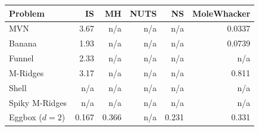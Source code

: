 \begin{tabular}{lrrrrr}
\toprule
Problem & IS & MH & NUTS & NS & MoleWhacker \\
\midrule
MVN & 3.67 & n/a & n/a & n/a & 0.0337 \\
Banana & 1.93 & n/a & n/a & n/a & 0.0739 \\
Funnel & 2.33 & n/a & n/a & n/a & n/a \\
M-Ridges & 3.17 & n/a & n/a & n/a & 0.811 \\
Shell & n/a & n/a & n/a & n/a & n/a \\
Spiky M-Ridges & n/a & n/a & n/a & n/a & n/a \\
\midrule
Eggbox ($d=2$) & 0.167 & 0.366 & n/a & 0.231 & 0.331 \\
\bottomrule
\end{tabular}
